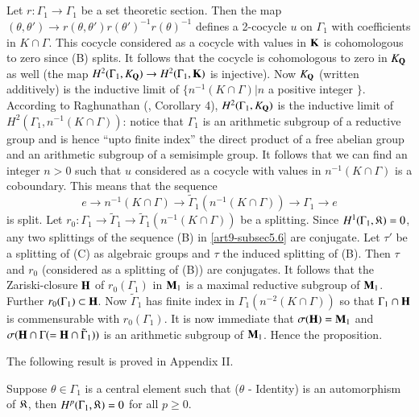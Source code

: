 \subsection{}\label{art9-subsec5.8}
Let $r: \Gamma_1 \to \Gamma_1$ be a set theoretic section. Then the map $(\theta, \theta') \to r (\theta, \theta') r (\theta')^{-1} r (\theta)^{-1}$ defines a 2-cocycle $u$ on $\Gamma_1$ with coefficients in $K \cap \Gamma$. This cocycle considered as a cocycle with values in $\mathbf{K}$ is cohomologous to zero since (B) splits. It follows that the cocycle is cohomologous to zero in $K_{\mathbf{Q}}$ as well (the map $H^2 (\Gamma_1, K_{\mathbf{Q}}) \to H^2(\Gamma_1, \mathbf{K})$ is injective). Now $K_{\mathbf{Q}}$ (written additively) is the inductive limit of $\{n^{-1} (K \cap \Gamma) \big| n$ a positive integer $\}$. According to Raghunathan (\cite{art9-raghunathan-3}, Corollary 4), $H^2 (\Gamma_1, K_{\mathbf{Q}})$ is the inductive limit of $H^2 (\Gamma_1, n^{-1} (K \cap \Gamma))$: notice that $\Gamma_1$ is an arithmetic subgroup of a reductive group and is hence ``upto finite index'' the direct product of a free abelian group and an arithmetic subgroup of a semisimple group. It follows that we can find an integer $n > 0$ such that $u$ considered as a cocycle with values in $n^{-1} (K \cap \Gamma)$ is a coboundary. This means that the sequence
$$
e \to n^{-1} (K \cap \Gamma) \to \tilde{\Gamma}_1 (n^{-1} (K \cap \Gamma)) \to \Gamma_1 \to e 
$$
is split. Let $r_0 : \Gamma_1 \to \tilde{\Gamma}_1 \to \tilde{\Gamma}_1 (n^{-1} (K \cap \Gamma))$ be a splitting. Since $H^1 (\Gamma_1, \mathfrak{K}) = 0$, any two splittings of the sequence (B) in \ref{art9-subsec5.6} are conjugate. Let $\tau'$ be a splitting of (C) as algebraic groups and $\tau$ the induced splitting of (B). Then $\tau$ and $r_0$ (considered as a splitting of (B)) are conjugates. It follows that the Zariski-closure $\mathbf{H}$ of $r_0 (\Gamma_1)$ in $\mathbf{M}_1$ is a maximal reductive subgroup of $\mathbf{M}_1$. Further $r_0 (\Gamma_1) \subset \mathbf{H}$. Now $\tilde{\Gamma}_1$ has finite index in $\Gamma_1 (n^{-2} (K \cap \Gamma))$ so that $\Gamma_1 \cap \mathbf{H}$ is commensurable with $r_0 (\Gamma_1).$ It is now immediate that $\sigma (\mathbf{H}) = \mathbf{M}_1$ and $\sigma (\mathbf{H} \cap \Gamma (= \mathbf{H} \cap \tilde{\Gamma}_1))$ is an arithmetic subgroup of $\mathbf{M}_1$. Hence the proposition.

The following result is proved in Appendix II.

\setcounter{definition}{8}
\begin{lemma}\label{art9-lem5.9}
Suppose $\theta \in \Gamma_1$ is a central element such that ($\theta$ - Identity) is an automorphism of $\mathfrak{K}$, then $H^p (\Gamma_1, \mathfrak{K})=0$ for all $p\geqslant 0$.
\end{lemma}

